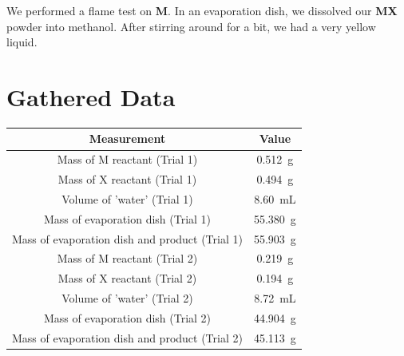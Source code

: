 \documentclass[titlepage]{article}
\begin{document}
\bigskip

We performed a flame test on \textbf{M}. In an evaporation dish, we dissolved our \textbf{MX} powder into methanol. After stirring around for a bit, we had a very yellow liquid. 

\section{Gathered Data}
\begin{tabular}{ |c|c| }
    \hline
    Measurement & Value \\
    \hline
    Mass of M reactant (Trial 1) &  \qty{0.512}{\gram}\\
    Mass of X reactant (Trial 1) & \qty{0.494}{\gram} \\
    Volume of 'water' (Trial 1) & \qty{8.60}{\milli\liter} \\
    Mass of evaporation dish (Trial 1) & \qty{55.380}{\gram} \\
    Mass of evaporation dish and product (Trial 1) & \qty{55.903}{\gram} \\
    Mass of M reactant (Trial 2) & \qty{0.219}{\gram} \\
    Mass of X reactant (Trial 2) & \qty{0.194}{\gram} \\
    Volume of 'water' (Trial 2) & \qty{8.72}{\milli\liter} \\
    Mass of evaporation dish (Trial 2) & \qty{44.904}{\gram} \\
    Mass of evaporation dish and product (Trial 2) & \qty{45.113}{\gram} \\
    \hline
    \end{tabular}
\end{document}
